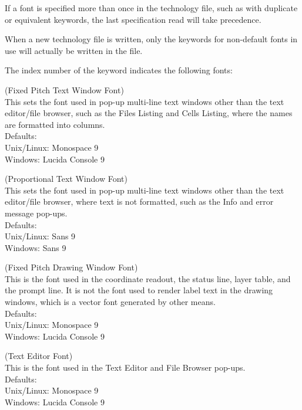 If a font is specified more than once in the technology file, such as
with duplicate or equivalent keywords, the last specification read
will take precedence.

When a new technology file is written, only the keywords for
non-default fonts in use will actually be written in the file.

The index number of the keyword indicates the following fonts:
\begin{description}
\item{} (Fixed Pitch Text Window Font)\\
This sets the font used in pop-up multi-line text windows other than
the text editor/file browser, such as the {\cb Files Listing} and {\cb
Cells Listing}, where the names are formatted into columns.\\
Defaults:\\
Unix/Linux: {\vt Monospace 9}\\
Windows: {\vt Lucida Console 9}

\item{} (Proportional Text Window Font)\\
This sets the font used in pop-up multi-line text windows other than
the text editor/file browser, where text is not formatted, such as the
{\cb Info} and error message pop-ups.\\
Defaults:\\
Unix/Linux: {\vt Sans 9}\\
Windows: {\vt Sans 9}

\item{} (Fixed Pitch Drawing Window Font)\\
This is the font used in the coordinate readout, the status line,
layer table, and the prompt line.  It is not the font used to render
label text in the drawing windows, which is a vector font generated by
other means.\\
Defaults:\\
Unix/Linux: {\vt Monospace 9}\\
Windows: {\vt Lucida Console 9}

\item{} (Text Editor Font)\\
This is the font used in the {\cb Text Editor} and {\cb File Browser}
pop-ups.\\
Defaults:\\
Unix/Linux: {\vt Monospace 9}\\
Windows: {\vt Lucida Console 9}


\end{description}
